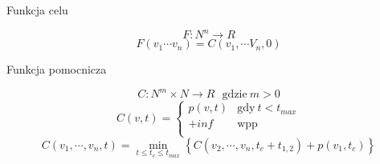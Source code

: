 \begin{frame}{Funkcja celu}
		
		\begin{equation}
			F : N^n \rightarrow R
		\end{equation}
		\begin{equation}
			F(v_1 \cdots v_n) = C(v_1, \cdots V_n, 0)
		\end{equation}

\end{frame}

\begin{frame}{Funkcja pomocnicza}
		
		\begin{equation}
			C : N^m \times N \rightarrow R \ \ \ \text{gdzie} \ m > 0
		\end{equation}
		\begin{equation}
			C(v, t) = \begin{cases}
				p(v, t)	&	\text{gdy} \ t < t_{max} 	\\
				+inf	&	\text{wpp}			\\
			\end{cases}
		\end{equation}
		\begin{equation}
			C(v_1, \cdots, v_n, t) = \min\limits_{t \leq t_c \le t_{max}}\left\{ C(v_2, \cdots, v_n, t_c + t_{1,2}) + p(v_1, t_c) \right\}
		\end{equation}

\end{frame}